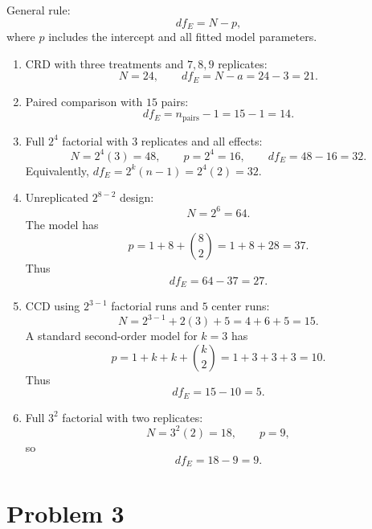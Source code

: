 \documentclass[11pt]{article}
\begin{document}
General rule:
\[
df_E=N-p,
\]
where \(p\) includes the intercept and all fitted model parameters.

\begin{enumerate}[label=(\alph*)]
\item CRD with three treatments and \(7,8,9\) replicates:
\[
N=24,\qquad df_E=N-a=24-3=21.
\]

\item Paired comparison with \(15\) pairs:
\[
df_E=n_{\text{pairs}}-1=15-1=14.
\]

\item Full \(2^4\) factorial with \(3\) replicates and all effects:
\[
N=2^4(3)=48,\qquad p=2^4=16,\qquad df_E=48-16=32.
\]
Equivalently, \(df_E=2^k(n-1)=2^4(2)=32\).

\item Unreplicated \(2^{8-2}\) design:
\[
N=2^6=64.
\]
The model has
\[
p=1+8+\binom{8}{2}=1+8+28=37.
\]
Thus
\[
df_E=64-37=27.
\]

\item CCD using \(2^{3-1}\) factorial runs and \(5\) center runs:
\[
N=2^{3-1}+2(3)+5=4+6+5=15.
\]
A standard second-order model for \(k=3\) has
\[
p=1+k+k+\binom{k}{2}=1+3+3+3=10.
\]
Thus
\[
df_E=15-10=5.
\]

\item Full \(3^2\) factorial with two replicates:
\[
N=3^2(2)=18,\qquad p=9,
\]
so
\[
df_E=18-9=9.
\]
\end{enumerate}

\section*{Problem 3}
\end{document}
